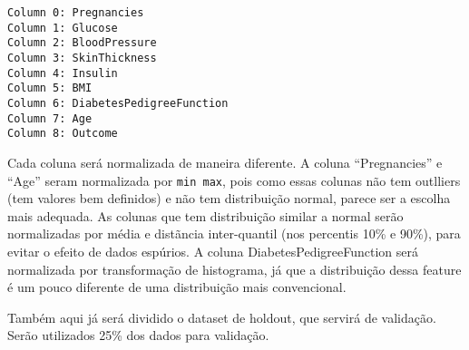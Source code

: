 \documentclass[11pt]{article}
\begin{document}
    \begin{Verbatim}[commandchars=\\\{\}]
Column 0: Pregnancies
Column 1: Glucose
Column 2: BloodPressure
Column 3: SkinThickness
Column 4: Insulin
Column 5: BMI
Column 6: DiabetesPedigreeFunction
Column 7: Age
Column 8: Outcome
    \end{Verbatim}

    Cada coluna será normalizada de maneira diferente. A coluna
``Pregnancies'' e ``Age'' seram normalizada por \texttt{min\ max}, pois
como essas colunas não tem outlliers (tem valores bem definidos) e não
tem distribuição normal, parece ser a escolha mais adequada. As colunas
que tem distribuição similar a normal serão normalizadas por média e
distãncia inter-quantil (nos percentis 10\% e 90\%), para evitar o
efeito de dados espúrios. A coluna DiabetesPedigreeFunction será
normalizada por transformação de histograma, já que a distribuição dessa
feature é um pouco diferente de uma distribuição mais convencional.

Também aqui já será dividido o dataset de holdout, que servirá de
validação. Serão utilizados 25\% dos dados para validação.
\end{document}
